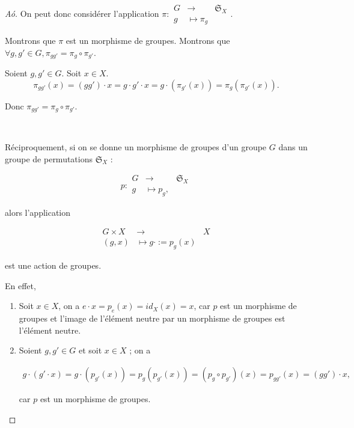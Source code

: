 \documentclass[french]{book}
\theoremstyle{definition}
\theoremstyle{remark}
\begin{document}
\begin{proof}[A\textpi\'o\textdelta\textepsilon\textiota\textxi\textiota]
  On peut donc considérer l'application $\pi:
    \begin{array}{rcl}
    G & \longrightarrow & \mathfrak{S}_{X}  \\
    g & \longmapsto \pi_g
    \end{array}$.

  Montrons que $\pi$ est un morphisme de groupes. Montrons que $\forall g, g' \in G, \pi _{g g'} = \pi_g \circ \pi _{g'}$.

  Soient $g, g' \in G$. Soit $x \in X$. $$\pi _{ gg'}(x) = (g g') \cdot x = g \cdot g' \cdot x = g \cdot (\pi _{ g'} (x)) = \pi_g (\pi _{ g'}(x)).$$

  Donc $\pi _{ gg'} = \pi_g \circ \pi _{ g'}$.

  \

  Réciproquement, si on se donne un morphisme de groupes d'un groupe $G$ dans un groupe de permutations $\mathfrak{S}_{X} $ :

  \[
  p:
    \begin{array}{rcl}
    G & \longrightarrow & \mathfrak{S}_{X}  \\
    g & \longmapsto p_g,
    \end{array}
  \]

  alors l'application

  \[
    \begin{array}{rcl}
    G \times X & \longrightarrow & X \\
    (g,x) & \longmapsto g \cdot := p_g(x)
    \end{array}
  \]

  est une action de groupes.

  En effet,

  \begin{enumerate}
    \item Soit $x \in X$, on a $e \cdot x = p_e(x) = id_X(x) = x$, car $p$ est un morphisme de groupes et l'image de l'élément neutre par un morphisme de groupes est l'élément neutre.
    \item Soient $g, g' \in G$ et soit $x \in X$ ; on a

    \begin{gather*}
      g \cdot (g' \cdot x) = g \cdot (p _{g'}(x)) = p_g(p _{g'}(x)) = (p_g \circ p _{g'})(x) = p _{gg'}(x) = (gg') \cdot x,
    \end{gather*}

    car $p$ est un morphisme de groupes.
  \end{enumerate}
\end{proof}
\end{document}
